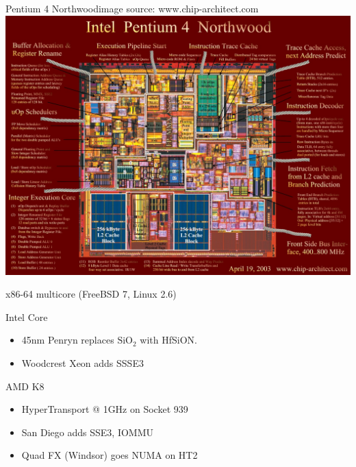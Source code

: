 \documentclass[mathserif,xcolor={dvipsnames,table}]{beamer}
\begin{document}
\begin{frame}{Pentium 4 Northwood\hfill\tiny{image source: www.chip-architect.com}}
\includegraphics[width=\textwidth]{images/northwood.jpg}
\end{frame}

\begin{frame}[t]{x86-64 multicore (FreeBSD 7, Linux 2.6)}
\begin{block}{Intel Core}
\begin{itemize}
\item 45nm Penryn replaces $\text{SiO}_2$ with HfSiON.
\item Woodcrest Xeon adds SSSE3
\end{itemize}
\end{block}
\begin{block}{AMD K8}
\begin{itemize}
\item HyperTransport @ 1GHz on Socket 939
\item San Diego adds SSE3, IOMMU
\item Quad FX (Windsor) goes NUMA on HT2
\end{itemize}
\end{block}
\vfill
\begin{center}
\end{center}
\end{frame}
\end{document}
